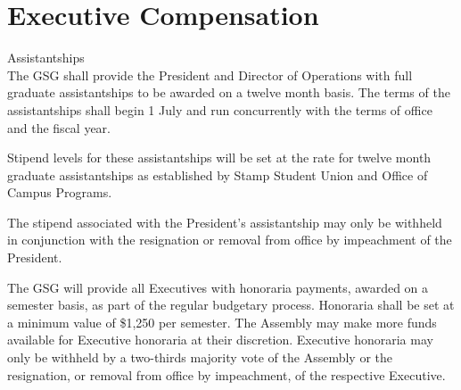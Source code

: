 \section{Executive Compensation}
\begin{bylaws-number}
  \item Assistantships \hfill \\
The GSG shall provide the President and Director of Operations with full graduate assistantships to be awarded on a twelve month basis. The terms of the assistantships shall begin 1 July and run concurrently with the terms of office and the fiscal year.
\begin{bylaws-number}
  \item Stipend levels for these assistantships will be set at the rate for twelve month graduate assistantships as established by Stamp Student Union and Office of Campus Programs.
  \item The stipend associated with the President’s assistantship may only be withheld in conjunction with the resignation or removal from office by impeachment of the President.
\end{bylaws-number}
  \item The GSG will provide all Executives with honoraria payments, awarded on a semester basis, as part of the regular budgetary process. Honoraria shall be set at a minimum value of \$1,250 per semester. The Assembly may make more funds available for Executive honoraria at their discretion. Executive honoraria may only be withheld by a two-thirds majority vote of the Assembly or the resignation, or removal from office by impeachment, of the respective Executive.
\end{bylaws-number}

